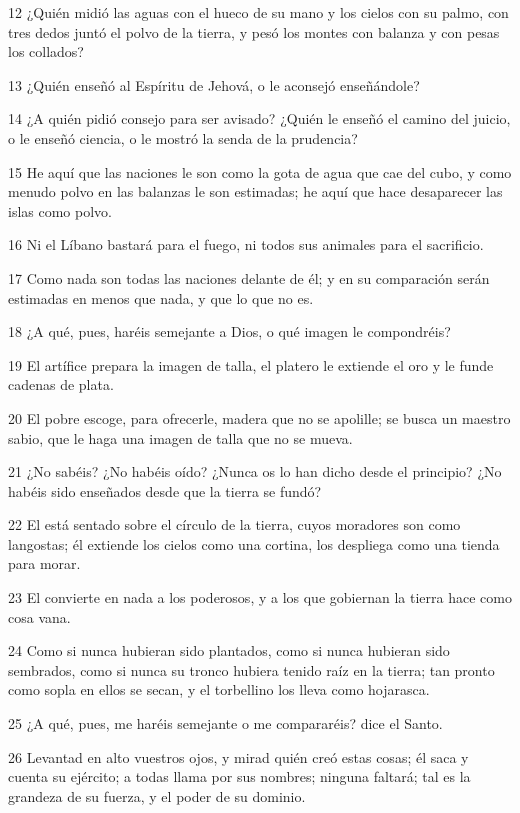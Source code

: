 \par 12 ¿Quién midió las aguas con el hueco de su mano y los cielos con su palmo, con tres dedos juntó el polvo de la tierra, y pesó los montes con balanza y con pesas los collados?
\par 13 ¿Quién enseñó al Espíritu de Jehová, o le aconsejó enseñándole? 
\par 14 ¿A quién pidió consejo para ser avisado? ¿Quién le enseñó el camino del juicio, o le enseñó ciencia, o le mostró la senda de la prudencia?
\par 15 He aquí que las naciones le son como la gota de agua que cae del cubo, y como menudo polvo en las balanzas le son estimadas; he aquí que hace desaparecer las islas como polvo.
\par 16 Ni el Líbano bastará para el fuego, ni todos sus animales para el sacrificio.
\par 17 Como nada son todas las naciones delante de él; y en su comparación serán estimadas en menos que nada, y que lo que no es.
\par 18 ¿A qué, pues, haréis semejante a Dios, o qué imagen le compondréis?
\par 19 El artífice prepara la imagen de talla, el platero le extiende el oro y le funde cadenas de plata.
\par 20 El pobre escoge, para ofrecerle, madera que no se apolille; se busca un maestro sabio, que le haga una imagen de talla que no se mueva.
\par 21 ¿No sabéis? ¿No habéis oído? ¿Nunca os lo han dicho desde el principio? ¿No habéis sido enseñados desde que la tierra se fundó?
\par 22 El está sentado sobre el círculo de la tierra, cuyos moradores son como langostas; él extiende los cielos como una cortina, los despliega como una tienda para morar.
\par 23 El convierte en nada a los poderosos, y a los que gobiernan la tierra hace como cosa vana.
\par 24 Como si nunca hubieran sido plantados, como si nunca hubieran sido sembrados, como si nunca su tronco hubiera tenido raíz en la tierra; tan pronto como sopla en ellos se secan, y el torbellino los lleva como hojarasca.
\par 25 ¿A qué, pues, me haréis semejante o me compararéis? dice el Santo.
\par 26 Levantad en alto vuestros ojos, y mirad quién creó estas cosas; él saca y cuenta su ejército; a todas llama por sus nombres; ninguna faltará; tal es la grandeza de su fuerza, y el poder de su dominio.
